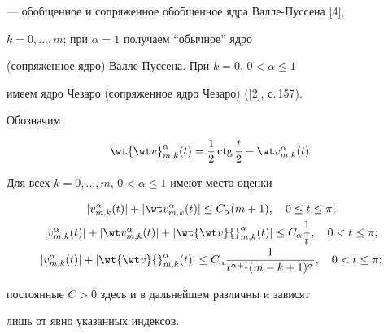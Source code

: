 --- обобщенное и сопряженное обобщенное ядра Валле-Пуссена [4],


$k=0,\dotsc,m$; при $\alpha =1$ получаем ``обычное'' ядро


(сопряженное ядро) Валле-Пуссена. При $k=0$, $0<\alpha \le 1$


имеем ядро Чезаро (сопряженное ядро Чезаро) ([2], с.\,157).


Обозначим


\begin{equation}


\wt{\wt v}_{ m, k}^{\alpha}(t)=\frac{1}{2}\ctg \frac{t}{2}-


\wt v_{ m, k}^{\alpha}(t).


\end{equation}








\begin{lems}


Для всех $k=0,\dotsc,m$, $0<\alpha \le 1$ имеют место оценки


\begin{gather}




| v_{ m, k}^{\alpha}(t)|+|\wt v_{ m, k}^{\alpha}(t)|\le


C_{\alpha}(m+1), \quad 0\le t\le\pi;\\


%


| v_{ m, k}^{\alpha}(t)|+|\wt v_{ m, k}^{\alpha}(t)|+


|\wt{\wt v}{}_{ m, k}^{\alpha}(t)|\le


C_{\alpha}\frac {1}{t}, \quad 0< t\le\pi;\\


%


|v_{ m, k}^{\alpha}(t)|+|\wt{\wt v}{}_{ m, k}^{\alpha}(t)|\le


C_{\alpha}\frac {1}{t^{\alpha+1}(m-k+1)^{\alpha}},\quad 0< t\le\pi;




\end{gather}


постоянные $C>0$ здесь и в дальнейшем различны и зависят


лишь от явно указанных индексов.


\end{lems}





